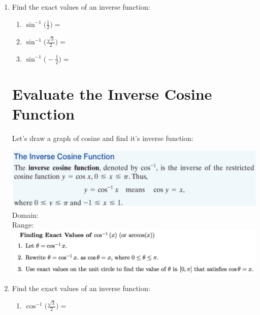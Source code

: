 \documentclass[11pt]{article}
\begin{document}
\begin{enumerate}
\vspace{-.1in}
\item Find the exact values of an inverse function:

\begin{enumerate} 
\item $\displaystyle \sin^{-1}\Bigg(\frac{1}{2}\Bigg)=$\\[.5in]

\item $\displaystyle \sin^{-1}\Bigg(\frac{\sqrt{3}}{2}\Bigg)=$\\[.5in]

\item $\displaystyle \sin^{-1}\Bigg(-\frac{1}{2}\Bigg)=$\\[.5in]
\end{enumerate}




\section{Evaluate the Inverse Cosine Function}

Let's draw a graph of cosine and find it's inverse function:
\vfill

\includegraphics[scale=.7]{cosineinverse}\\
\noindent Domain:\\[.5in]
\noindent Range:\\

\newpage
\includegraphics[scale=.7]{findingcosineinverse}\\




\vspace{-.1in}
\item Find the exact values of an inverse function:
 \begin{enumerate}
\item $\displaystyle \cos^{-1}\Bigg(\frac{\sqrt{3}}{2}\Bigg)=$\\[.5in]


\end{enumerate}
\end{enumerate}
\end{document}
